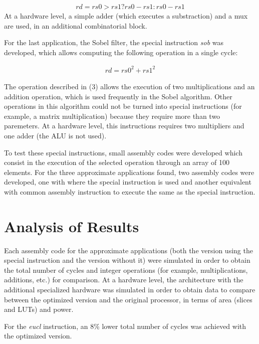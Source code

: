 \documentclass[conference]{IEEEtran}
\begin{document}
\begin{align}
 rd = rs0 > rs1 ? rs0-rs1 : rs0-rs1
\end{align}
At a hardware level, a simple adder (which executes a substraction) and a mux are used, in an additional combinatorial block.

For the last application, the Sobel filter, the special instruction \emph{sob} was developed, which allows computing the following operation in a single cycle:

 \begin{align}
  rd = rs0^2 + rs1^2
 \end{align}

The operation described in (3) allows the execution of two multiplications and an addition operation, which is used frequently in the Sobel algorithm. Other operations 
in this algorithm could not be turned into special instructions (for example, a matrix multiplication) because they require more than two paremeters. 
At a hardware level, this instructions requires two multipliers and one adder (the ALU is not used).

To test these special instructions, small assembly codes were developed which consist in the execution of the selected operation through an array of 100 elements. For the three
approximate applications found, two assembly codes were developed, one with where the special instruction is used and another equivalent with common assembly instruction to 
execute the same as the special instruction.

\section{Analysis of Results}

Each assembly code for the approximate applications (both the version using the special instruction and the version without it) were simulated in order to obtain the total number of cycles
and integer operations (for example, multiplications, additions, etc.) for comparison. At a hardware level, the architecture with the additional specialized hardware was simulated in order
to obtain data to compare between the optimized version and the original processor, in terms of area (slices and LUTs) and power. 


For the \emph{eucl} instruction, an 8\% lower total number of cycles was achieved with the optimized version.

\begin{table}[h!]
\begin{center}
\caption{Cycles comparison for the \emph{eucl} instruction}
\label{tab:schd}
\end{center}
\end{table}
\end{document}
